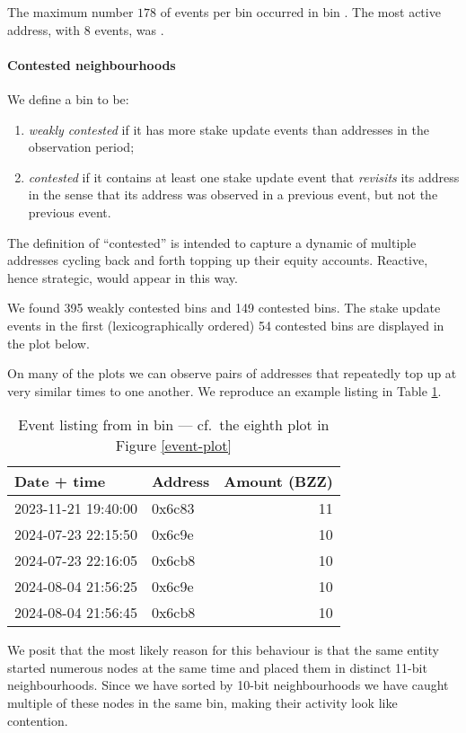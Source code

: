 The maximum number $178$ of events per bin occurred in bin .
%
The most active address, with $8$ events, was .

\paragraph{Contested neighbourhoods}
We define a bin to be:
\begin{enumerate}
  \item \emph{weakly contested} if it has more stake update events than addresses in the observation period;
  \item \emph{contested} if it contains at least one stake update event that \emph{revisits} its address in the sense that its address was observed in a previous event, but not the previous event.
\end{enumerate}
The definition of ``contested'' is intended to capture a dynamic of multiple addresses cycling back and forth topping up their equity accounts.
%
Reactive, hence strategic, would appear in this way.

We found 395 weakly contested bins and 149 contested bins. 
%
The stake update events in the first (lexicographically ordered) 54 contested bins are displayed in the plot below.




On many of the plots we can observe pairs of addresses that repeatedly top up at very similar times to one another.
%
We reproduce an example listing in Table \ref{event-listing}.
%
\begin{table}
\begin{tabular}{llr}
Date + time         & Address & Amount (BZZ) \\
\hline
2023-11-21 19:40:00 & 0x6c83 &   11 \\
2024-07-23 22:15:50 &	0x6c9e  &	10 \\
2024-07-23 22:16:05 &	0x6cb8  &	10 \\
2024-08-04 21:56:25 &	0x6c9e  &	10 \\
2024-08-04 21:56:45 &	0x6cb8  &	10
\end{tabular}
\caption{Event listing from in bin  --- cf.~the eighth plot in Figure \ref{event-plot}}
\label{event-listing}
\end{table}
%
We posit that the most likely reason for this behaviour is that the same entity started numerous nodes at the same time and placed them in distinct 11-bit neighbourhoods.
%
Since we have sorted by 10-bit neighbourhoods we have caught multiple of these nodes in the same bin, making their activity look like contention.


